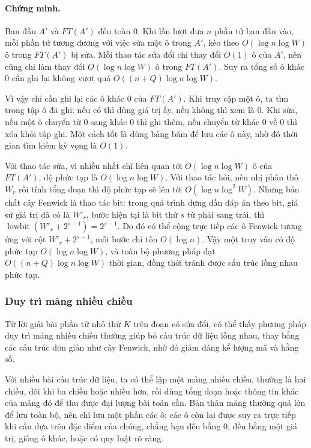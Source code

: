 \documentclass[11pt]{article}
\begin{document}
\paragraph{Chứng minh.}
Ban đầu \(A'\) và \(FT(A')\) đều toàn \(0\). Khi lần lượt đưa \(n\) phần tử ban
đầu vào, mỗi phần tử tương đương với việc sửa một ô trong \(A'\), kéo theo
\(O(\log n\log W)\) ô trong \(FT(A')\) bị sửa. Mỗi thao tác sửa đổi chỉ thay
đổi \(O(1)\) ô của \(A'\), nên cũng chỉ làm thay đổi
\(O(\log n\log W)\) ô trong \(FT(A')\). Suy ra tổng số ô khác \(0\) cần ghi lại
không vượt quá \(O((n+Q)\log n\log W)\).

Vì vậy chỉ cần ghi lại các ô khác \(0\) của \(FT(A')\). Khi truy cập một ô, ta
tìm trong tập ô đã ghi: nếu có thì dùng giá trị ấy, nếu không thì xem là \(0\).
Khi sửa, nếu một ô chuyển từ \(0\) sang khác \(0\) thì ghi thêm, nếu chuyển từ
khác \(0\) về \(0\) thì xóa khỏi tập ghi. Một cách tốt là dùng bảng băm để lưu
các ô này, nhờ đó thời gian tìm kiếm kỳ vọng là \(O(1)\).

Với thao tác sửa, vì nhiều nhất chỉ liên quan tới
\(O(\log n\log W)\) ô của \(FT(A')\), độ phức tạp là
\(O(\log n\log W)\). Với thao tác hỏi, nếu nhị phân thô \(W_r\) rồi tính tổng
đoạn thì độ phức tạp sẽ lên tới \(O(\log n\log^2 W)\). Nhưng bản chất cây
Fenwick là thao tác bit: trong quá trình dựng dần đáp án theo bit, giả sử giá
trị đã có là \(W'_r\), bước hiện tại là bit thứ \(s\) từ phải sang trái, thì
\(\operatorname{lowbit}(W'_r+2^{s-1})=2^{s-1}\). Do đó có thể cộng trực tiếp
các ô Fenwick tương ứng với cột \(W'_r+2^{s-1}\), mỗi bước chỉ tốn
\(O(\log n)\). Vậy một truy vấn có độ phức tạp \(O(\log n\log W)\), và toàn bộ
phương pháp đạt \(O((n+Q)\log n\log W)\) thời gian, đồng thời tránh được cấu
trúc lồng nhau phức tạp.

\subsubsection{Duy trì mảng nhiều chiều}

Từ lời giải bài phần tử nhỏ thứ \(K\) trên đoạn có sửa đổi, có thể thấy phương
pháp duy trì mảng nhiều chiều thường giúp bỏ cấu trúc dữ liệu lồng nhau, thay
bằng các cấu trúc đơn giản như cây Fenwick, nhờ đó giảm đáng kể lượng mã và
hằng số.

Với nhiều bài cấu trúc dữ liệu, ta có thể lập một mảng nhiều chiều, thường là
hai chiều, đôi khi ba chiều hoặc nhiều hơn, rồi dùng tổng đoạn hoặc thông tin
khác của mảng đó để thu được đại lượng bài toán cần. Bản thân mảng thường quá
lớn để lưu toàn bộ, nên chỉ lưu một phần các ô; các ô còn lại được suy ra trực
tiếp khi cần dựa trên đặc điểm của chúng, chẳng hạn đều bằng \(0\), đều bằng
một giá trị, giống ô khác, hoặc có quy luật rõ ràng.
\end{document}

